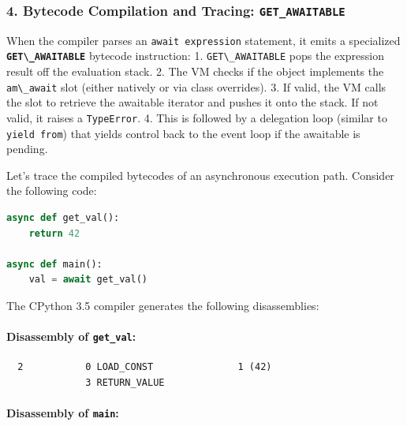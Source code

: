 \hypertarget{bytecode-compilation-and-tracing-get_awaitable}{%
\subsubsection{\texorpdfstring{4. Bytecode Compilation and Tracing:
\texttt{GET\_AWAITABLE}}{4. Bytecode Compilation and Tracing: GET\_AWAITABLE}}\label{bytecode-compilation-and-tracing-get_awaitable}}

When the compiler parses an \passthrough{\lstinline!await expression!}
statement, it emits a specialized
\textbf{\passthrough{\lstinline!GET\_AWAITABLE!}} bytecode instruction:
1. \passthrough{\lstinline!GET\_AWAITABLE!} pops the expression result
off the evaluation stack. 2. The VM checks if the object implements the
\passthrough{\lstinline!am\_await!} slot (either natively or via class
overrides). 3. If valid, the VM calls the slot to retrieve the awaitable
iterator and pushes it onto the stack. If not valid, it raises a
\passthrough{\lstinline!TypeError!}. 4. This is followed by a delegation
loop (similar to \passthrough{\lstinline!yield from!}) that yields
control back to the event loop if the awaitable is pending.

Let's trace the compiled bytecodes of an asynchronous execution path.
Consider the following code:

\begin{lstlisting}[language=Python]
async def get_val():
    return 42

async def main():
    val = await get_val()
\end{lstlisting}

The CPython 3.5 compiler generates the following disassemblies:

\hypertarget{disassembly-of-get_val}{%
\paragraph{\texorpdfstring{Disassembly of
\texttt{get\_val}:}{Disassembly of get\_val:}}\label{disassembly-of-get_val}}

\begin{lstlisting}
  2           0 LOAD_CONST               1 (42)
              3 RETURN_VALUE
\end{lstlisting}

\hypertarget{disassembly-of-main}{%
\paragraph{\texorpdfstring{Disassembly of
\texttt{main}:}{Disassembly of main:}}\label{disassembly-of-main}}

